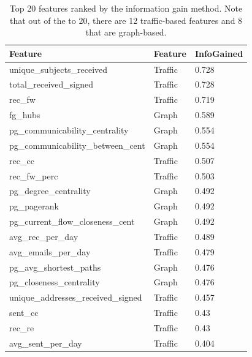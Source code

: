 \documentclass{article}
\begin{document}
\begin{table}[H]
\centering
\caption{Top 20 features ranked by the information gain method.  Note that out of the to 20, there are 12 traffic-based features and 8 that are graph-based.}
\label{tab:ranked_feats}
\begin{tabular}{|l|l|l|}
\hline
Feature                                      & Feature      & InfoGained \\\hline
unique\_subjects\_received                   & Traffic      & 0.728  \\
total\_received\_signed                      & Traffic      & 0.728  \\
rec\_fw                                      & Traffic      & 0.719  \\
fg\_hubs                                     & Graph        & 0.589  \\
pg\_communicability\_centrality              & Graph        & 0.554  \\
pg\_communicability\_between\_cent           & Graph        & 0.554  \\
rec\_cc                                      & Traffic      & 0.507  \\
rec\_fw\_perc                                & Traffic      & 0.503  \\
pg\_degree\_centrality                       & Graph        & 0.492  \\
pg\_pagerank                                 & Graph        & 0.492  \\
pg\_current\_flow\_closeness\_cent           & Graph        & 0.492  \\
avg\_rec\_per\_day                           & Traffic      & 0.489  \\
avg\_emails\_per\_day                        & Traffic      & 0.479  \\
pg\_avg\_shortest\_paths                     & Graph        & 0.476  \\
pg\_closeness\_centrality                    & Graph        & 0.476  \\
unique\_addresses\_received\_signed          & Traffic      & 0.457  \\
sent\_cc                                     & Traffic      & 0.43   \\
rec\_re                                      & Traffic      & 0.43   \\
avg\_sent\_per\_day                          & Traffic      & 0.404  \\ \hline
\end{tabular}
\end{table}
\end{document}
